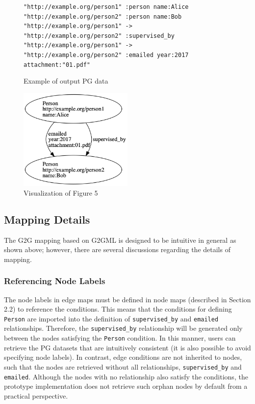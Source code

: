 \documentclass[runningheads]{llncs}
\begin{document}
\begin{figure}[!t]
\begin{scriptsize}
\begin{verbatim}
"http://example.org/person1" :person name:Alice
"http://example.org/person2" :person name:Bob
"http://example.org/person1" -> "http://example.org/person2" :supervised_by
"http://example.org/person1" -> "http://example.org/person2" :emailed year:2017 attachment:"01.pdf"
\end{verbatim}
\end{scriptsize}
\caption{Example of output PG data}
\label{fig:example-pg}
\end{figure}


\begin{figure}
\center
\includegraphics[width=0.5\textwidth]{pg_example5.png}
\caption{Visualization of Figure 5}
\label{fig:pg_example5}
\end{figure}

\subsection{Mapping Details}
\label{subsec:mapping-details}
The G2G mapping based on G2GML is designed to be intuitive in general as shown above; however, there are several discussions regarding the details of mapping.

\subsubsection{Referencing Node Labels}
The node labels in edge maps must be defined in node maps (described in Section 2.2) to reference the conditions. This means that the conditions for defining \texttt{Person} are imported into the definition of \texttt{supervised\_by} and \texttt{emailed} relationships. Therefore, the \texttt{supervised\_by} relationship will be generated only between the nodes satisfying the \texttt{Person} condition. In this manner, users can retrieve the PG datasets that are intuitively consistent (it is also possible to avoid specifying node labels). In contrast, edge conditions are not inherited to nodes, such that the nodes are retrieved without all relationships, \texttt{supervised\_by} and \texttt{emailed}. Although the nodes with no relationship also satisfy the conditions, the prototype implementation does not retrieve such orphan nodes by default from a practical perspective.
\end{document}
